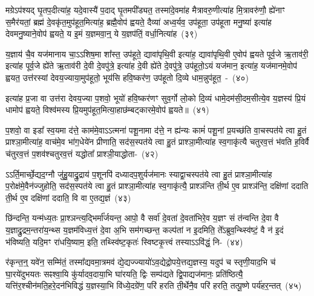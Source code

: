 मग्रे\-ऽप॑श्यद् घृ॒तप॒दीत्या॑ह॒ यदे॒वास्यै॑ प॒दाद् घृ॒तमपी᳚ड्यत॒ तस्मा॑दे॒वमा॑ह मैत्रावरु॒णीत्या॑ह मि॒त्रावरु॑णौ॒ ह्ये॑नाꣳ स॒मैर॑यतां॒ ब्रह्म॑ दे॒वकृ॑त॒मुप॑हूत॒मित्या॑ह॒ ब्रह्मै॒वोप॑ ह्वयते॒ दैव्या॑ अध्व॒र्यव॒ उप॑हूता॒ उप॑हूता मनु॒ष्या॑ इत्या॑ह देवमनु॒ष्याने॒वोप॑ ह्वयते॒ य इ॒मं य॒ज्ञमवा॒न्॒ ये य॒ज्ञप॑तिं॒ वर्धा॒नित्या॑ह~(३९)

य॒ज्ञाय॑ चै॒व यज॑मानाय चा॒\-ऽऽ\-शिष॒मा शा᳚स्त॒ उप॑हूते॒ द्यावा॑\-पृथि॒वी इत्या॑ह॒ द्यावा॑\-पृथि॒वी ए॒वोप॑ ह्वयते पूर्व॒जे ऋ॒ताव॑री॒ इत्या॑ह पूर्व॒जे ह्ये॑ते ऋ॒ताव॑री दे॒वी दे॒वपु॑त्रे॒ इत्या॑ह दे॒वी ह्ये॑ते दे॒वपु॑त्रे॒ उप॑हूतो॒\-ऽयं यज॑मान॒ इत्या॑ह॒ यज॑मानमे॒वोप॑ ह्वयत॒ उत्त॑रस्यां देवय॒ज्याया॒मुप॑हूतो॒ भूय॑सि हवि॒ष्कर॑ण॒ उप॑हूतो दि॒व्ये धाम॒न्नुप॑हूत॒~-~(४०)

इत्या॑ह प्र॒जा वा उत्त॑रा देवय॒ज्या प॒शवो॒ भूयो॑ हवि॒ष्कर॑णꣳ सुव॒र्गो लो॒को दि॒व्यं धामे॒दम॑सी॒दम॒सीत्ये॒व य॒ज्ञस्य॑ प्रि॒यं धामोप॑ ह्वयते॒ विश्व॑मस्य प्रि॒यमुप॑हूत॒मित्या॒हाछ॑म्बट्कारमे॒वोप॑ ह्वयते॥~(४१)

{\anuvakamend[{आ॒ह॒ धे॒नुरे॒तां वर्धा॒नित्या॑ह॒ धाम॒न्नुप॑हूत॒श्चतु॑स्त्रिꣳशच्च}]}%

प॒शवो॒ वा इडा᳚ स्व॒यमा द॑त्ते॒ काम॑मे॒वा\-ऽऽ\-त्मना॑ पशू॒नामा द॑त्ते॒ न ह्य॑न्यः कामं॑ पशू॒नां प्र॒यच्छ॑ति वा॒चस्पत॑ये त्वा हु॒तं प्राश्ञा॒मीत्या॑ह॒ वाच॑मे॒व भा॑ग॒धेये॑न प्रीणाति॒ सद॑स॒स्पत॑ये त्वा हु॒तं प्राश्ञा॒मीत्या॑ह स्व॒गाकृ॑त्यै चतुरव॒त्तं भ॑वति ह॒विर्वै च॑तुरव॒त्तं प॒शव॑श्चतुरव॒त्तं यद्धोता᳚ प्राश्ञी॒याद्धोता-~(४२)

ऽ\-ऽर्ति॒मार्च्छे॒द्यद॒ग्नौ जु॑हु॒याद्रु॒द्राय॑ प॒शूनपि॑ दध्यादप॒शुर्यज॑मानः स्याद्वा॒चस्पत॑ये त्वा हु॒तं प्राश्ञा॒मीत्या॑ह प॒रोक्ष॑मे॒वैन॑ज्जुहोति॒ सद॑स॒स्पत॑ये त्वा हु॒तं प्राश्ञा॒मीत्या॑ह स्व॒गाकृ॑त्यै॒ प्राश्ञ॑न्ति ती॒र्थ ए॒व प्राश्ञ॑न्ति॒ दक्षि॑णां ददाति ती॒र्थ ए॒व दक्षि॑णां ददाति॒ वि वा ए॒तद्य॒ज्ञं~(४३)

छि॑न्दन्ति॒ यन्म॑ध्य॒तः प्रा॒श्ञन्त्य॒द्भिर्मा᳚र्जयन्त॒ आपो॒ वै सर्वा॑ दे॒वता॑ दे॒वता॑भिरे॒व य॒ज्ञꣳ सं त॑न्वन्ति दे॒वा वै य॒ज्ञाद्रु॒द्रम॒न्तरा॑य॒न्थ्स य॒ज्ञम॑विध्य॒त्तं दे॒वा अ॒भि सम॑गच्छन्त॒ कल्प॑तां न इ॒दमिति॒ ते᳚\-ऽब्रुव॒न्थ्स्वि॑ष्टं॒ वै न॑ इ॒दं भ॑विष्यति॒ यदि॒मꣳ रा॑धयि॒ष्याम॒ इति॒ तथ्स्वि॑ष्ट॒कृतः॑ स्विष्टकृ॒त्त्वं तस्या\-ऽऽ\-वि॑द्धं॒ नि-~(४४)

र॑कृन्त॒न्॒ यवे॑न॒ सम्मि॑तं॒ तस्मा᳚द्यवमा॒त्रमव॑ द्ये॒द्यज्ज्यायो॑\-ऽव॒द्येद्रो॒पये॒त्तद्य॒ज्ञस्य॒ यदुप॑ च स्तृणी॒याद॒भि च॑ घा॒रये॑दुभयतः सꣴश्वा॒यि कु॑र्यादव॒दाया॒भि घा॑रयति॒ द्विः सम्प॑द्यते द्वि॒पाद्यज॑मानः॒ प्रति॑ष्ठित्यै॒ यत्ति॑र॒श्चीन॑मति॒हरे॒दन॑भिविद्धं य॒ज्ञस्या॒भि वि॑ध्ये॒दग्रे॑ण॒ परि॑ हरति ती॒र्थेनै॒व परि॑ हरति॒ तत्पू॒ष्णे पर्य॑हर॒न्तत्~(४५)

